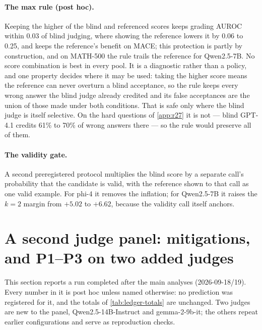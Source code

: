 \paragraph{The max rule (post hoc).}
Keeping the higher of the blind and referenced scores keeps grading AUROC within 0.03 of blind judging, where showing the reference lowers it by 0.06 to 0.25, and keeps the reference's benefit on \textsc{MACE}; this protection is partly by construction, and on MATH-500 the rule trails the reference for Qwen2.5-7B.\ph{} No score combination is best in every pool. It is a diagnostic rather than a policy, and one property decides where it may be used: taking the higher score means the reference can never overturn a blind acceptance, so the rule keeps every wrong answer the blind judge already credited and its false acceptances are the union of those made under both conditions. That is safe only where the blind judge is itself selective. On the hard questions of \cref{app:r27} it is not --- blind GPT-4.1 credits 61\% to 70\% of wrong answers there --- so the rule would preserve all of them.

\paragraph{The validity gate.}
A second preregistered protocol multiplies the blind score by a separate call's probability that the candidate is valid, with the reference shown to that call as one valid example. For phi-4 it removes the inflation; for Qwen2.5-7B it raises the $k{=}2$ margin from $+5.02$ to $+6.62$, because the validity call itself anchors.


\section{A second judge panel: mitigations, and P1--P3 on two added judges}
\label{app:panel2}

This section reports a run completed after the main analyses (2026-09-18/19). Every number in it is
post hoc\ph{} unless named otherwise: no prediction was registered for it, and the totals of
\cref{tab:ledger-totals} are unchanged. Two judges are new to the panel, Qwen2.5-14B-Instruct and
gemma-2-9b-it; the others repeat earlier configurations and serve as reproduction checks.

